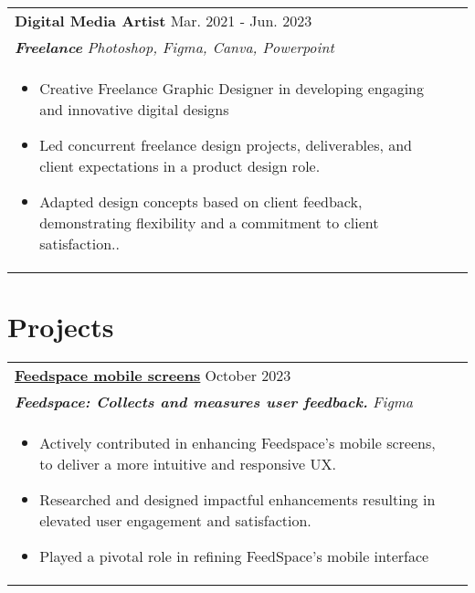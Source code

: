 \documentclass[a4paper,8pt]{article}
\begin{document}
\begin{tabularx}{\linewidth}{ @{}l r@{} }
\color[HTML]{1C033C} \textbf{Digital Media Artist} \hfill \color[HTML]{371e77} Mar. 2021 - Jun. 2023 \\[4pt]
\color[HTML]{371e77}\textbf{\textit{Freelance}} \hfill \color[HTML]{4B28A4} \textit{Photoshop, Figma, Canva, Powerpoint} \\[5pt]
\begin{minipage}[t]{\linewidth}
    \begin{itemize}[nosep,after=\strut, leftmargin=2em, itemsep=2pt]
        \item Creative Freelance Graphic Designer in developing engaging and innovative digital designs
        \item Led concurrent freelance design projects, deliverables, and client expectations in a product design role.
        \item Adapted design concepts based on client feedback, demonstrating flexibility and a commitment to client satisfaction..
    \end{itemize}
    \end{minipage}
\end{tabularx}

\section{Projects}
\begin{tabularx}{\linewidth}{ @{}l r@{} }
\color[HTML]{1C033C} \textbf{\uline{\href{https://github.com/}{Feedspace mobile screens}}} \hfill \color[HTML]{371e77} October 2023  \\[4pt]
\color[HTML]{371e77}\textbf{\textit{Feedspace: Collects and measures user feedback.}} \hfill \color[HTML]{4B28A4} \textit{Figma} \\[5pt]
\begin{minipage}[t]{\linewidth}
    \begin{itemize}[nosep,after=\strut, leftmargin=2em, itemsep=2pt]
        \item Actively contributed in enhancing Feedspace's mobile screens, to deliver a more intuitive and responsive UX.
        \item Researched and designed impactful enhancements resulting in elevated user engagement and satisfaction.
        \item Played a pivotal role in refining FeedSpace's mobile interface
    \end{itemize}
    \end{minipage}
\end{tabularx}
\end{document}
